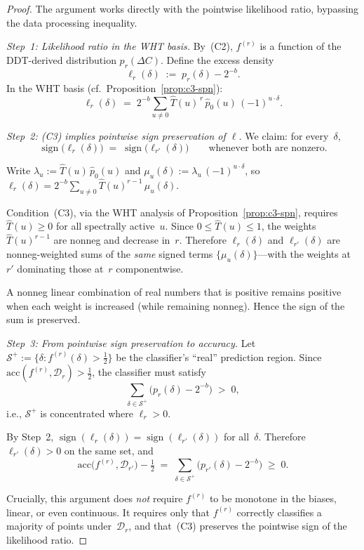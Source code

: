 \documentclass[runningheads]{llncs}
\begin{document}
\begin{proof}
The argument works directly with the pointwise likelihood ratio,
bypassing the data processing inequality.

\medskip\noindent\textit{Step~1: Likelihood ratio in the WHT basis.}
By~(C2), $f^{(r)}$ is a function of the DDT-derived distribution
$p_r(\Delta C)$.
Define the excess density
\[
  \ell_r(\delta)
  \;:=\;
  p_r(\delta) - 2^{-b}.
\]
In the WHT basis (cf.\ Proposition~\ref{prop:c3-spn}):
\[
  \ell_r(\delta)
  \;=\;
  2^{-b}\!\sum_{u \neq 0}
  \hat{T}(u)^{\,r}\,\hat{p}_0(u)\,(-1)^{u \cdot \delta}.
\]

\medskip\noindent\textit{Step~2: (C3) implies pointwise sign
preservation of $\ell$.}
We claim: for every~$\delta$,
\[
  \operatorname{sign}\!\bigl(\ell_r(\delta)\bigr)
  \;=\;
  \operatorname{sign}\!\bigl(\ell_{r'}(\delta)\bigr)
  \qquad\text{whenever both are nonzero.}
\]

Write $\lambda_u := \hat{T}(u)\,\hat{p}_0(u)$ and
$\mu_u(\delta) := \lambda_u\,(-1)^{u \cdot \delta}$, so
$\ell_r(\delta) = 2^{-b}\sum_{u \neq 0}
\hat{T}(u)^{r-1}\,\mu_u(\delta)$.

Condition~(C3), via the WHT analysis of
Proposition~\ref{prop:c3-spn}, requires
$\hat{T}(u) \geq 0$ for all spectrally active~$u$.
Since $0 \leq \hat{T}(u) \leq 1$, the weights
$\hat{T}(u)^{r-1}$ are nonneg and decrease in~$r$.
Therefore $\ell_r(\delta)$ and $\ell_{r'}(\delta)$ are
nonneg-weighted sums of the \emph{same} signed terms
$\{\mu_u(\delta)\}$---with the weights at~$r'$ dominating
those at~$r$ componentwise.

A nonneg linear combination of real numbers that is positive remains
positive when each weight is increased (while remaining nonneg).
Hence the sign of the sum is preserved.

\medskip\noindent\textit{Step~3: From pointwise sign preservation to
accuracy.}
Let $\mathcal{S}^+ := \{\delta : f^{(r)}(\delta) > \tfrac{1}{2}\}$ be
the classifier's ``real'' prediction region.
Since $\mathrm{acc}(f^{(r)}, \mathcal{D}_r) > \tfrac{1}{2}$, the
classifier must satisfy
\[
  \sum_{\delta \in \mathcal{S}^+}
  \bigl(p_r(\delta) - 2^{-b}\bigr)
  \;>\; 0,
\]
i.e., $\mathcal{S}^+$ is concentrated where $\ell_r > 0$.

By Step~2, $\operatorname{sign}(\ell_r(\delta))
= \operatorname{sign}(\ell_{r'}(\delta))$ for all~$\delta$.
Therefore $\ell_{r'}(\delta) > 0$ on the same set, and
\[
  \mathrm{acc}\bigl(f^{(r)}, \mathcal{D}_{r'}\bigr) - \tfrac{1}{2}
  \;=\;
  \sum_{\delta \in \mathcal{S}^+}
  \bigl(p_{r'}(\delta) - 2^{-b}\bigr)
  \;\geq\; 0.
\]

Crucially, this argument does \emph{not} require $f^{(r)}$ to be
monotone in the biases, linear, or even continuous.
It requires only that $f^{(r)}$ correctly classifies a majority of
points under~$\mathcal{D}_r$, and that~(C3) preserves the pointwise
sign of the likelihood ratio.
\end{proof}
\end{document}
